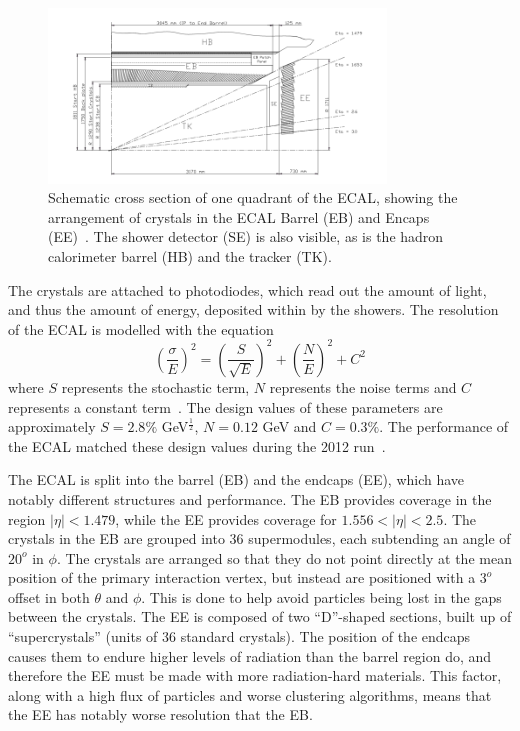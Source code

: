 \documentclass[10pt]{article}
\begin{document}
\begin{figure}[h]
  \centering
  \includegraphics[width=0.8\textwidth]{"EcalEBEE"}
  \caption{Schematic cross section of one quadrant of the ECAL, showing the arrangement of crystals in the ECAL Barrel (EB) and Encaps (EE)~\cite{cmsEcal}. The shower detector (SE) is also visible, as is the hadron calorimeter barrel (HB) and the tracker (TK).}
  \label{ecal}
\end{figure}


The crystals are attached to photodiodes, which read out the amount of light, and thus the amount of energy, deposited within by the showers. The resolution of the ECAL is modelled with the equation \begin{equation} \left( \frac{\sigma}{E}\right) ^2= \left( \frac{S}{\sqrt{E}} \right)^2 + \left( \frac{N}{E} \right)^2 + C^2\end{equation} where $S$ represents the stochastic term, $N$ represents the noise terms and $C$ represents a constant term~\cite{CMSDesign}. The design values of these parameters are approximately $S=2.8\%$ GeV$^\frac{1}{2}$, $ N= 0.12$ GeV and $C=0.3 \%$. The performance of the ECAL matched these design values during the 2012 run~\cite{ECAL2012}. 


The ECAL is split into the barrel (EB) and the endcaps (EE), which have notably different structures and performance. The EB provides coverage in the region $|\eta| < 1.479$, while the EE provides coverage for $1.556 < |\eta| < 2.5$. The crystals in the EB are grouped into 36 supermodules, each subtending an angle of $20^o$ in $\phi$. The crystals are arranged so that they do not point directly at the mean position of the primary interaction vertex, but instead are positioned with a $3^o$ offset in both $\theta$ and $\phi$. This is done to help avoid particles being lost in the gaps between the crystals. The EE is composed of two ``D''-shaped sections, built up of ``supercrystals'' (units of 36 standard crystals). The position of the endcaps causes them to endure higher levels of radiation than the barrel region do, and therefore the EE must be made with more radiation-hard materials. This factor, along with a high flux of particles and worse clustering algorithms, means that the EE has notably worse resolution that the EB. 
\end{document}
